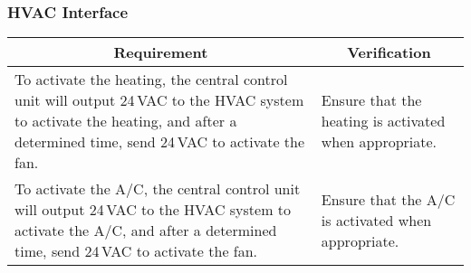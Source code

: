 \subsubsection{HVAC Interface}
\begin{tabular}{|p{\mytabwidth}|p{\mytabwidth}|}
\hline
\multicolumn{1}{|c|}{Requirement} & \multicolumn{1}{|c|}{Verification} \\
\hline\hline
To activate the heating, the central control unit will output 24\,VAC to the HVAC system to activate the heating, and after a determined time, send 24\,VAC to activate the fan. &
Ensure that the heating is activated when appropriate. \\
\hline
To activate the A/C, the central control unit will output 24\,VAC to the HVAC system to activate the A/C, and after a determined time, send 24\,VAC to activate the fan. &
Ensure that the A/C is activated when appropriate. \\
\hline
\end{tabular}
